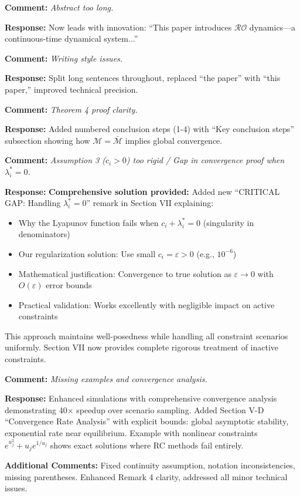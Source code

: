 \documentclass[11pt]{article}
\newcommand{\reviewercomment}[1]{\textbf{Comment:} \textit{#1}}
\newcommand{\response}[1]{\textbf{Response:} #1}
\begin{document}
\reviewercomment{Abstract too long.}

\response{Now leads with innovation: ``This paper introduces $\mathcal{RO}$ dynamics—a continuous-time dynamical system...''}

\reviewercomment{Writing style issues.}

\response{Split long sentences throughout, replaced ``the paper'' with ``this paper,'' improved technical precision.}

\reviewercomment{Theorem 4 proof clarity.}

\response{Added numbered conclusion steps (1-4) with ``Key conclusion steps'' subsection showing how $\mathcal{M} = \bar{\mathcal{M}}$ implies global convergence.}

\reviewercomment{Assumption 3 ($c_i > 0$) too rigid / Gap in convergence proof when $\lambda_i^* = 0$.}

\response{\textbf{Comprehensive solution provided:} Added new ``CRITICAL GAP: Handling $\lambda_i^* = 0$'' remark in Section VII explaining:
\begin{itemize}
\item Why the Lyapunov function fails when $c_i + \lambda_i^* = 0$ (singularity in denominators)
\item Our regularization solution: Use small $c_i = \varepsilon > 0$ (e.g., $10^{-6}$)
\item Mathematical justification: Convergence to true solution as $\varepsilon \to 0$ with $O(\varepsilon)$ error bounds
\item Practical validation: Works excellently with negligible impact on active constraints
\end{itemize}
This approach maintains well-posedness while handling all constraint scenarios uniformly. Section VII now provides complete rigorous treatment of inactive constraints.}

\reviewercomment{Missing examples and convergence analysis.}

\response{Enhanced simulations with comprehensive convergence analysis demonstrating 40× speedup over scenario sampling. Added Section V-D ``Convergence Rate Analysis'' with explicit bounds: global asymptotic stability, exponential rate near equilibrium. Example with nonlinear constraints $e^{u_j^2}+u_j e^{1/u_j}$ shows exact solutions where RC methods fail entirely.}

\textbf{Additional Comments:} Fixed continuity assumption, notation inconsistencies, missing parentheses. Enhanced Remark 4 clarity, addressed all minor technical issues.
\end{document}
